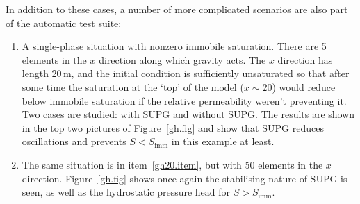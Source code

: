 \documentclass[]{scrreprt}
\begin{document}
In addition to these cases, a number of more complicated scenarios are
also part of the automatic test suite:
\begin{enumerate}
\item\label{gh20.item} A single-phase situation with nonzero immobile saturation.
  There are 5 elements in the $x$ direction along which gravity acts.
  The $x$ direction has length 20\,m, and the initial condition is
  sufficiently unsaturated so that after some time the saturation at
  the `top' of the model ($x\sim 20$) would reduce below immobile
  saturation if the relative permeability weren't preventing it.  Two
  cases are studied: with SUPG and without SUPG.  The results are
  shown in the top two pictures of Figure~\ref{gh.fig} and show that
  SUPG reduces oscillations and prevents $S<S_{\mathrm{imm}}$ in this
  example at least.
\item The same situation is in item~\ref{gh20.item}, but with 50
  elements in the $x$ direction.  Figure~\ref{gh.fig} shows once again
  the stabilising nature of SUPG is seen, as well as the hydrostatic
  pressure head for $S>S_{\mathrm{imm}}$.
\end{enumerate}
\end{document}
